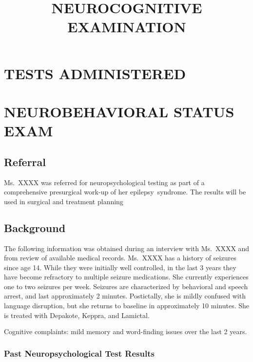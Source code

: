 \documentclass[
  letterpaper,
  DIV=11,
  numbers=noendperiod,
  oneside]{scrartcl}
\title{NEUROCOGNITIVE EXAMINATION}
\author{}
\date{}
\begin{document}
\maketitle
\hypertarget{tests-administered}{%
\section{TESTS ADMINISTERED}\label{tests-administered}}

\hypertarget{neurobehavioral-status-exam}{%
\section{NEUROBEHAVIORAL STATUS
EXAM}\label{neurobehavioral-status-exam}}

\hypertarget{referral}{%
\subsection{Referral}\label{referral}}

Ms.~XXXX was referred for neuropsychological testing as part of a
comprehensive presurgical work-up of her epilepsy~syndrome. The results
will be used in surgical and treatment planning

\hypertarget{background}{%
\subsection{Background}\label{background}}

The following information was obtained during an interview with Ms.~XXXX
and from review of available medical records. Ms.~XXXX has a history of
seizures since age 14. While they were initially well controlled, in the
last 3 years they have become refractory to multiple seizure
medications. She currently experiences one to two seizures per week.
Seizures are characterized by behavioral and speech arrest, and last
approximately 2 minutes. Postictally, she is mildly confused with
language disruption, but she returns to baseline in approximately 10
minutes. She is treated with Depakote, Keppra, and Lamictal.

Cognitive complaints: mild memory and word-finding issues over the last
2 years.

\hypertarget{past-neuropsychological-test-results}{%
\subsubsection{Past Neuropsychological Test
Results}\label{past-neuropsychological-test-results}}
\end{document}
